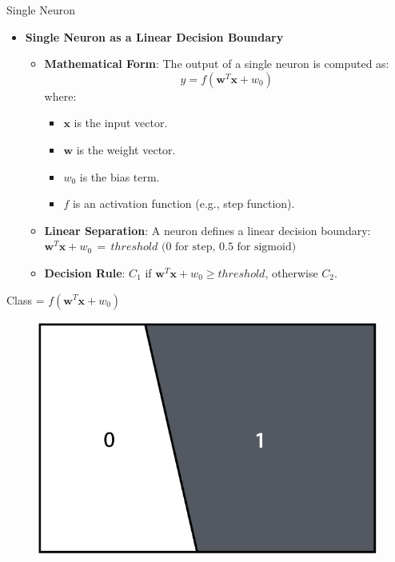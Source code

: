 \documentclass[serif, aspectratio=169]{beamer}
\begin{document}
\begin{frame}{Single Neuron}
    \begin{itemize}
        \item \textbf{Single Neuron as a Linear Decision Boundary}
        \medskip
        \begin{itemize}\itemsep1em
        \item \textbf{Mathematical Form}:
        The output of a single neuron is computed as:
        \[
        y = f(\mathbf{w}^T \mathbf{x} + w_0)
        \]
        where:
        \begin{itemize}
            \item \( \mathbf{x} \) is the input vector.
            \item \( \mathbf{w} \) is the weight vector.
            \item \( w_0 \) is the bias term.
            \item \( f \) is an activation function (e.g., step function).
        \end{itemize}
        
        \item \textbf{Linear Separation}: 
        A neuron defines a linear decision boundary: \\
        \(
        \mathbf{w}^T \mathbf{x} + w_0 \, = \, threshold \text{ (0 for step, 0.5 for sigmoid)}
        \)
        \item \textbf{Decision Rule}:
        $C_1$ if \( \mathbf{w}^T \mathbf{x} + w_0 \geq threshold \), otherwise $C_2$.
        \end{itemize}
    \end{itemize}
    \endminipage
    \hfill
        \centering Class = \(f(\mathbf{w}^T \mathbf{x} + w_0)\)
        \begin{figure}
            \centering
            \includegraphics[width=.8\linewidth]{pic/Figure_20.png}
        \end{figure}
    \endminipage
    \vfill
\end{frame}
\end{document}

